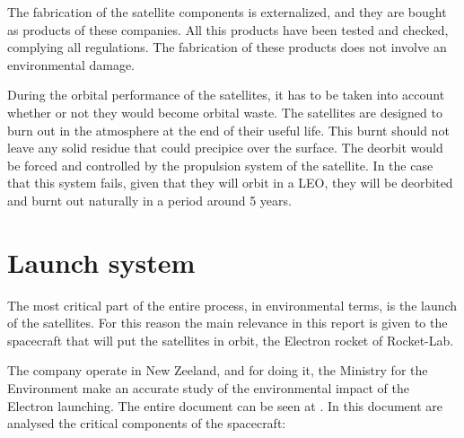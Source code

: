 The fabrication of the satellite components is externalized, and they are bought as products of these companies. All this products have been tested and checked, complying all regulations. The fabrication of these products does not involve an environmental damage. 

During the orbital performance of the satellites, it has to be taken into account whether or not they would become orbital waste. The satellites are designed to burn out in the atmosphere at the end of their useful life. This burnt should not leave any solid residue that could precipice over the surface. The deorbit would be forced and controlled by the propulsion system of the satellite. In the case that this system fails, given that they will orbit in a LEO, they will be deorbited and burnt out naturally in a period around 5 years.

\section{Launch system}
The most critical part of the entire process, in environmental terms, is the launch of the satellites. For this reason the main relevance in this report is given to the spacecraft that will put the satellites in orbit, the Electron rocket of Rocket-Lab.

The company operate in New Zeeland, and for doing it, the Ministry for the Environment make an accurate study of the environmental impact of the Electron launching. The entire document can be seen at \cite{EIS}.
In this document are analysed the critical components of the spacecraft:

